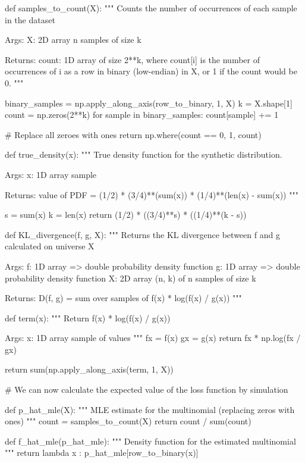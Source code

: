 \begin{python}
def samples_to_count(X):
    """
    Counts the number of occurrences of each sample in the dataset
    
    Args:
       X:   2D array  n samples of size k
       
    Returns:
       count:  1D array of size 2**k, where count[i] is the number of
               occurrences of i as a row in binary (low-endian) in X,
               or 1 if the count would be 0.
    """
    
    binary_samples = np.apply_along_axis(row_to_binary, 1, X)
    k = X.shape[1]
    count = np.zeros(2**k)
    for sample in binary_samples:
        count[sample] += 1
    
    # Replace all zeroes with ones
    return np.where(count == 0, 1, count)


def true_density(x):
    """
    True density function for the synthetic distribution.
    
    Args:
       x:  1D array  sample
       
    Returns:
       value of PDF = (1/2) * (3/4)**(sum(x)) * (1/4)**(len(x) - sum(x))
    """
    
    s = sum(x)
    k = len(x)
    return (1/2) * ((3/4)**s) * ((1/4)**(k - s))


def KL_divergence(f, g, X):
    """
    Returns the KL divergence between f and g calculated on universe X
    
    Args:
       f:  1D array => double  probability density function
       g:  1D array => double  probability density function
       X:  2D array (n, k) of n samples of size k
       
    Returns:  D(f, g) = sum over samples of f(x) * log(f(x) / g(x))
    """
    
    def term(x):
        """ 
        Return f(x) * log(f(x) / g(x)) 
        
        Args:
           x:  1D array sample of values
        """
        fx = f(x)
        gx = g(x)
        return fx * np.log(fx / gx)
    
    return sum(np.apply_along_axis(term, 1, X))
\end{python}

\begin{python}
# We can now calculate the expected value of the loss function by simulation

def p_hat_mle(X):
    """ MLE estimate for the multinomial (replacing zeros with ones) """
    count = samples_to_count(X)
    return count / sum(count)


def f_hat_mle(p_hat_mle):
    """ Density function for the estimated multinomial """
    return lambda x : p_hat_mle[row_to_binary(x)]
\end{python}

